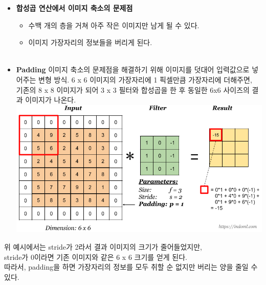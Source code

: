 \documentclass[11pt]{article}
\makeatletter
\def\maxwidth{\ifdim\Gin@nat@width>\linewidth\linewidth
    \else\Gin@nat@width\fi}
\let\Oldincludegraphics\includegraphics
\renewcommand{\includegraphics}[1]{\Oldincludegraphics[width=.8\maxwidth]{#1}}
\providecommand{\tightlist}{%
      \setlength{\itemsep}{0pt}\setlength{\parskip}{0pt}}
\makeatother
\begin{document}
\begin{itemize}
\tightlist
\item
  \textbf{합성곱 연산에서 이미지 축소의 문제점}

  \begin{itemize}
  \tightlist
  \item
    수백 개의 층을 거쳐 아주 작은 이미지만 남게 될 수 있다.
  \item
    이미지 가장자리의 정보들을 버리게 된다.\\
    \\
  \end{itemize}
\item
  \textbf{Padding} 이미지 축소의 문제점을 해결하기 위해 이미지를 덧대어
  입력값으로 넣어주는 변형 방식. 6 x 6 이미지의 가장자리에 1 픽셀만큼
  가장자리에 더해주면,\\
  기존의 8 x 8 이미지가 되어 3 x 3 필터와 합성곱을 한 후 동일한 6x6
  사이즈의 결과 이미지가 나온다.
  \includegraphics{./Images/c4week1/6-0.png} 
\end{itemize}

위 예시에서는 stride가 2라서 결과 이미지의 크기가 줄어들었지만,\\
stride가 0이라면 기존 이미지와 같은 6 x 6 크기를 얻게 된다.\\
따라서, padding을 하면 가장자리의 정보를 모두 취할 순 없지만 버리는 양을
줄일 수 있다.
\end{document}
